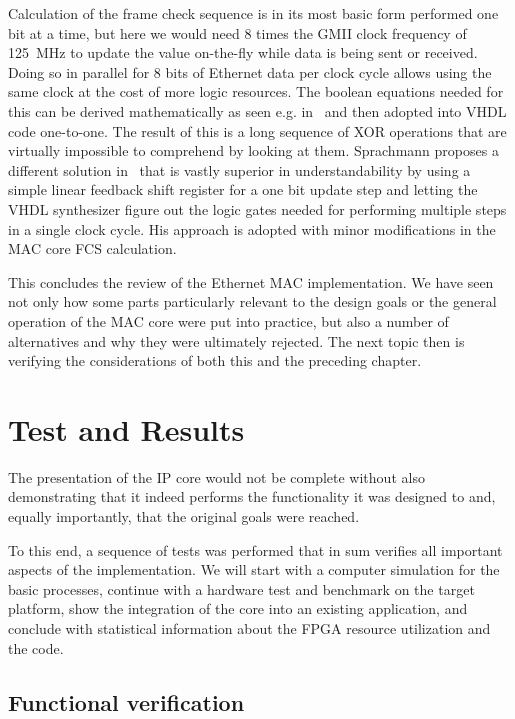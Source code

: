 \documentclass[a4paper, 11pt, oneside]{Thesis}  %
\begin{document}
Calculation of the frame check sequence is in its most basic form performed one bit at a time, but here we would need 8 times the GMII clock frequency of 125~MHz to update the value on-the-fly while data is being sent or received. Doing so in parallel for 8 bits of Ethernet data per clock cycle allows using the same clock at the cost of more logic resources. The boolean equations needed for this can be derived mathematically as seen e.g. in~\cite{CRC32USB3} and then adopted into VHDL code one-to-one. The result of this is a long sequence of XOR operations that are virtually impossible to comprehend by looking at them. Sprachmann proposes a different solution in~\cite{ParallelCRC} that is vastly superior in understandability by using a simple linear feedback shift register for a one bit update step and letting the VHDL synthesizer figure out the logic gates needed for performing multiple steps in a single clock cycle. His approach is adopted with minor modifications in the MAC core FCS calculation.

\parskip

This concludes the review of the Ethernet MAC implementation. We have seen not only how some parts particularly relevant to the design goals or the general operation of the MAC core were put into practice, but also a number of alternatives and why they were ultimately rejected. The next topic then is verifying the considerations of both this and the preceding chapter.

\chapter{Test and Results}\label{ch:test}

The presentation of the IP core would not be complete without also demonstrating that it indeed performs the functionality it was designed to and, equally importantly, that the original goals were reached.

To this end, a sequence of tests was performed that in sum verifies all important aspects of the implementation. We will start with a computer simulation for the basic processes, continue with a hardware test and benchmark on the target platform, show the integration of the core into an existing application, and conclude with statistical information about the FPGA resource utilization and the code. 

\section{Functional verification}
\end{document}
